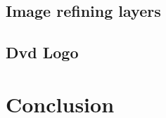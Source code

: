 \documentclass[11pt, a4paper]{article}
\begin{document}
	\subsection{Image refining layers}
	\subsection{Dvd Logo}
	
	\section{Conclusion}
	
	
	
	
\end{document}
